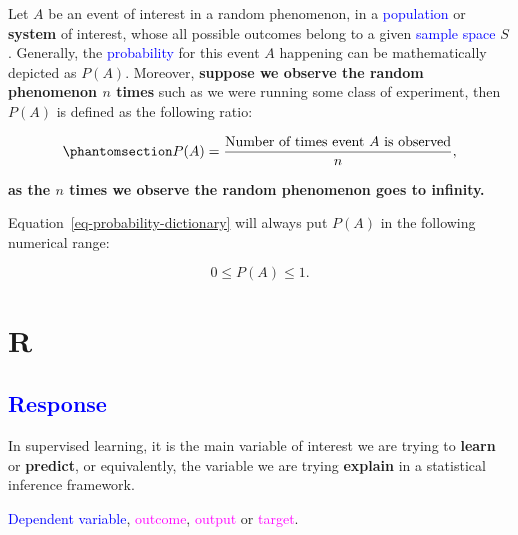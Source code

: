 \documentclass[
  letterpaper,
  DIV=11,
  numbers=noendperiod]{scrreprt}
\begin{document}
Let \(A\) be an event of interest in a random phenomenon, in a
\textcolor{blue}{population} or \textbf{system} of interest, whose all
possible outcomes belong to a given \textcolor{blue}{sample space}
\(S\). Generally, the \textcolor{blue}{probability} for this event \(A\)
happening can be mathematically depicted as \(P(A)\). Moreover,
\textbf{suppose we observe the random phenomenon \(n\) times} such as we
were running some class of experiment, then \(P(A)\) is defined as the
following ratio:

\begin{equation}\phantomsection\label{eq-probability-dictionary}{
P(A) = \frac{\text{Number of times event $A$ is observed}}{n},
}\end{equation}

\textbf{as the \(n\) times we observe the random phenomenon goes to
infinity.}

Equation~\ref{eq-probability-dictionary} will always put \(P(A)\) in the
following numerical range:

\[
0 \leq P(A) \leq 1.
\]

\section*{R}\label{r}


\subsection*{\texorpdfstring{\textcolor{blue}{Response}}{}}\label{section-8}

In supervised learning, it is the main variable of interest we are
trying to \textbf{learn} or \textbf{predict}, or equivalently, the
variable we are trying \textbf{explain} in a statistical inference
framework.

\begin{tcolorbox}[enhanced jigsaw, bottomrule=.15mm, breakable, colback=white, leftrule=.75mm, coltitle=black, rightrule=.15mm, bottomtitle=1mm, title=\textcolor{quarto-callout-warning-color}{\faExclamationTriangle}\hspace{0.5em}{Equivalent to:}, opacitybacktitle=0.6, toprule=.15mm, titlerule=0mm, arc=.35mm, colbacktitle=quarto-callout-warning-color!10!white, toptitle=1mm, colframe=quarto-callout-warning-color-frame, left=2mm, opacityback=0]

\textcolor{blue}{Dependent variable}, \textcolor{magenta}{outcome},
\textcolor{magenta}{output} or \textcolor{magenta}{target}.

\end{tcolorbox}
\end{document}
